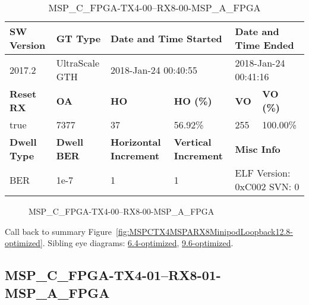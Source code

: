 \begin{table}[h]
\centering
\caption{MSP\_C\_FPGA-TX4-00--RX8-00-MSP\_A\_FPGA}
\label{tab:MSPCFPGATX400RX800MSPAFPGA12.8-optimized}
\begin{tabular}{@{}|l|l|l|l|l|l|@{}}
\toprule
\textbf{SW Version}                & \textbf{GT Type}   & \multicolumn{2}{l|}{\textbf{Date and Time Started}}            & \multicolumn{2}{l|}{\textbf{Date and Time Ended}}        \\ \midrule
2017.2                       & UltraScale GTH          & \multicolumn{2}{l|}{2018-Jan-24 00:40:55}                   & \multicolumn{2}{l|}{2018-Jan-24 00:41:16}               \\ \midrule
\textbf{Reset RX}                  & \textbf{OA} & \textbf{HO}   & \textbf{HO (\%)} & \textbf{VO} & \textbf{VO (\%)} \\ \midrule
true & 7377        & 37          & 56.92\%        & 255        & 100.00\%       \\ \midrule
\textbf{Dwell Type}                & \textbf{Dwell BER} & \textbf{Horizontal Increment} & \textbf{Vertical Increment}    & \multicolumn{2}{l|}{\textbf{Misc Info}}                  \\ \midrule
BER                            & 1e-7        & 1        & 1           & \multicolumn{2}{l|}{ELF Version: 0xC002 SVN: 0}                         \\ \bottomrule
\end{tabular}
\end{table}

\begin{figure}[h]
\caption{MSP\_C\_FPGA-TX4-00--RX8-00-MSP\_A\_FPGA} \label{fig:MSPCFPGATX400RX800MSPAFPGA12.8-optimized}
\end{figure}

Call back to summary Figure~\ref{fig:MSPCTX4MSPARX8MinipodLoopback12.8-optimized}.
Sibling eye diagrams: \hyperref[sec:MSPCFPGATX400RX800MSPAFPGA6.4-optimized]{6.4-optimized}, \hyperref[sec:MSPCFPGATX400RX800MSPAFPGA9.6-optimized]{9.6-optimized}.

\clearpage
\newpage


\subsection{MSP\_C\_FPGA-TX4-01--RX8-01-MSP\_A\_FPGA}\label{sec:MSPCFPGATX401RX801MSPAFPGA12.8-optimized}

